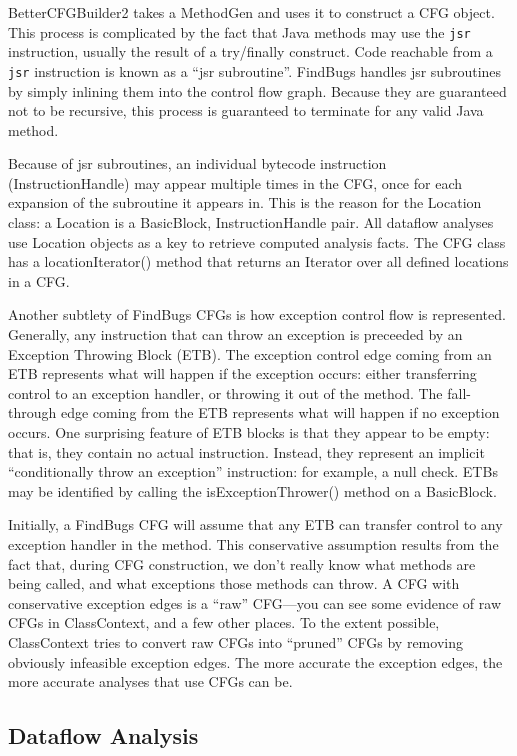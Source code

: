 \documentclass[11pt]{article}
\begin{document}
BetterCFGBuilder2 takes a MethodGen and uses it to construct a CFG object.
This process is complicated by the fact that Java methods may use
the {\tt jsr} instruction, usually the result of a try/finally construct.
Code reachable from a {\tt jsr} instruction is known as a ``jsr subroutine''.
FindBugs handles jsr subroutines by simply inlining them into the control flow graph.
Because they are guaranteed not to be recursive, this process is guaranteed to
terminate for any valid Java method.

Because of jsr subroutines, an individual bytecode instruction (InstructionHandle) may appear
multiple times in the CFG, once for each expansion of the subroutine it appears in.
This is the reason for the Location class: a Location is a BasicBlock, InstructionHandle
pair.  All dataflow analyses use Location objects as a key to retrieve computed
analysis facts.  The CFG class has a locationIterator() method that returns an
Iterator over all defined locations in a CFG.

Another subtlety of FindBugs CFGs is how exception control flow is
represented.  Generally, any instruction that can throw an exception is
preceeded by an Exception Throwing Block (ETB).  The exception control
edge coming from an ETB represents what will happen if the exception occurs:
either transferring control to an exception handler, or throwing it out
of the method.  The fall-through edge coming from the ETB represents
what will happen if no exception occurs.  One surprising feature of
ETB blocks is that they appear to be empty: that is, they contain no
actual instruction.  Instead, they represent an implicit ``conditionally throw an
exception'' instruction: for example, a null check.  ETBs may be
identified by calling the isExceptionThrower() method on a BasicBlock.

Initially, a FindBugs CFG will assume that any ETB can transfer control
to any exception handler in the method.  This conservative assumption results
from the fact that, during CFG construction, we don't really know what
methods are being called, and what exceptions those methods can throw.
A CFG with conservative exception edges is a ``raw'' CFG---you can see
some evidence of raw CFGs in ClassContext, and a few other places.
To the extent possible, ClassContext tries to convert raw CFGs into 
``pruned'' CFGs by removing obviously infeasible exception edges.
The more accurate the exception edges, the more accurate analyses that
use CFGs can be.

\subsection{Dataflow Analysis}
\end{document}

